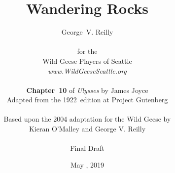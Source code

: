


\title{\Huge Wandering Rocks}
\author{George~V. Reilly\\
\\
{\small for the}\\
Wild Geese Players of Seattle\\
{\textit{www.WildGeeseSeattle.org}}\\
\\
{\small \textbf{Chapter~10} of \textit{Ulysses} by James Joyce}\\
{\small Adapted from the 1922~edition at Project Gutenberg}
\\
\\
{\small Based upon the 2004 adaptation for the Wild Geese by}\\
{\small Kieran O'Malley and George V. Reilly}\\
\\
{\small Final Draft}}
\date{May , 2019}
\raggedbottom



\maketitle
\thispagestyle{empty}
\pagebreak


